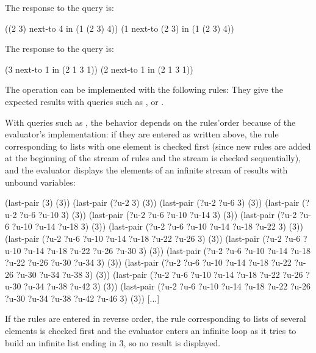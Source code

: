\begin{exe}[4.61]
    The response to the query  is:
    \begin{cscm}
        ((2 3) next-to 4 in (1 (2 3) 4))
        (1 next-to (2 3) in (1 (2 3) 4))
    \end{cscm}
    The response to the query  is:
    \begin{cscm}
        (3 next-to 1 in (2 1 3 1))
        (2 next-to 1 in (2 1 3 1))
    \end{cscm}
\end{exe}

\begin{exe}[4.62]
    \label{4.62}
    The operation can be implemented with the following rules:
    They give the expected results with queries such as
    ,\linebreak
     or
    .

    With queries such as , the behavior depends on the 
    rules’order because of the evaluator’s implementation: if they are entered 
    as written above, the rule corresponding to lists with one element is 
    checked first (since new rules are added at the beginning of the stream of 
    rules and the stream is checked sequentially), and the evaluator displays 
    the elements of an infinite stream of results with unbound variables:
    \begin{cscm}
        (last-pair (3) (3))
        (last-pair (?u-2 3) (3))
        (last-pair (?u-2 ?u-6 3) (3))
        (last-pair (?u-2 ?u-6 ?u-10 3) (3))
        (last-pair (?u-2 ?u-6 ?u-10 ?u-14 3) (3))
        (last-pair (?u-2 ?u-6 ?u-10 ?u-14 ?u-18 3) (3))
        (last-pair (?u-2 ?u-6 ?u-10 ?u-14 ?u-18 ?u-22 3) (3))
        (last-pair (?u-2 ?u-6 ?u-10 ?u-14 ?u-18 ?u-22 ?u-26 3) (3))
        (last-pair (?u-2 ?u-6 ?u-10 ?u-14 ?u-18 ?u-22 ?u-26 ?u-30 3) (3))
        (last-pair (?u-2 ?u-6 ?u-10 ?u-14 ?u-18 ?u-22 ?u-26 ?u-30 ?u-34 3) (3))
        (last-pair (?u-2 ?u-6 ?u-10 ?u-14 ?u-18 ?u-22 ?u-26 ?u-30 ?u-34 ?u-38 3) 
                (3))
        (last-pair (?u-2 ?u-6 ?u-10 ?u-14 ?u-18 ?u-22 ?u-26 ?u-30 ?u-34 ?u-38 
                ?u-42 3) (3))
        (last-pair (?u-2 ?u-6 ?u-10 ?u-14 ?u-18 ?u-22 ?u-26 ?u-30 ?u-34 ?u-38 
                ?u-42 ?u-46 3) (3))
        [...]
    \end{cscm}
    If the rules are entered in reverse order, the rule corresponding to lists 
    of several elements is checked first and the evaluator enters an infinite 
    loop as it tries to build an infinite list ending in 3, so no result is 
    displayed.
\end{exe}

